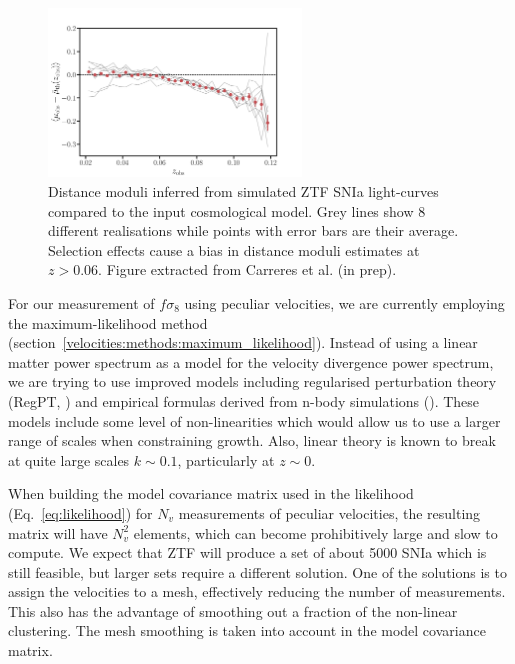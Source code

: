 \begin{figure}
    \centering
    \includegraphics[width=0.6\textwidth]{fig/velocities/bastien_hd_residuals.pdf}
    \caption{Distance moduli inferred from simulated ZTF SNIa light-curves compared to the input cosmological model. 
    Grey lines show 8 different realisations while points with error bars are their average. 
    Selection effects cause a bias in distance moduli estimates at $z>0.06$. 
    Figure extracted from Carreres et al. (in prep).}
    \label{fig:ztf_snsim_hubble_diagram}
\end{figure}

For our measurement of $f\sigma_8$ using peculiar velocities, we are currently employing 
the maximum-likelihood method (section~\ref{velocities:methods:maximum_likelihood}). 
Instead of using a linear matter power spectrum as a model for the velocity divergence 
power spectrum, we are trying to use improved models including regularised perturbation 
theory (RegPT, \cite{taruyaDirectFastCalculation2012}) and empirical formulas derived
from n-body simulations (\cite{belAccurateFittingFunctions2019}). 
These models include some level of non-linearities which would allow us to use 
a larger range of scales when constraining growth. Also, linear theory is known to break 
at quite large scales $k\sim 0.1$, particularly at $z\sim0$. 

When building the model covariance matrix used in the likelihood (Eq.~\ref{eq:likelihood})
for $N_v$ measurements of peculiar velocities, the resulting matrix will have $N_v^2$ elements, 
which can become prohibitively large and slow to compute. We expect that ZTF will produce a set 
of about 5000 SNIa which is still feasible, but larger sets require a different solution. 
One of the solutions is to assign the velocities to a mesh, effectively reducing the number of 
measurements. This also has the advantage of smoothing out a fraction of the non-linear clustering. 
The mesh smoothing is taken into account in the model covariance matrix. 

